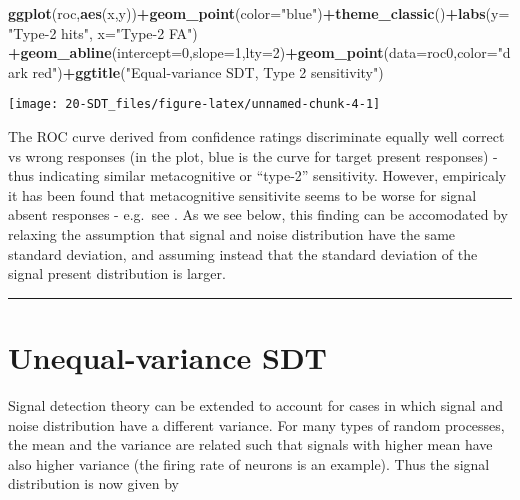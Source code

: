 \documentclass[
]{book}
\newenvironment{Shaded}{\begin{snugshade}}{\end{snugshade}}
\newcommand{\AttributeTok}[1]{\textcolor[rgb]{0.13,0.29,0.53}{#1}}
\newcommand{\DecValTok}[1]{\textcolor[rgb]{0.00,0.00,0.81}{#1}}
\newcommand{\FunctionTok}[1]{\textcolor[rgb]{0.13,0.29,0.53}{\textbf{#1}}}
\newcommand{\NormalTok}[1]{#1}
\newcommand{\SpecialCharTok}[1]{\textcolor[rgb]{0.81,0.36,0.00}{\textbf{#1}}}
\newcommand{\StringTok}[1]{\textcolor[rgb]{0.31,0.60,0.02}{#1}}
\begin{document}
\begin{Shaded}
\begin{Highlighting}[]
\FunctionTok{ggplot}\NormalTok{(roc,}\FunctionTok{aes}\NormalTok{(x,y))}\SpecialCharTok{+}\FunctionTok{geom\_point}\NormalTok{(}\AttributeTok{color=}\StringTok{"blue"}\NormalTok{)}\SpecialCharTok{+}\FunctionTok{theme\_classic}\NormalTok{()}\SpecialCharTok{+}\FunctionTok{labs}\NormalTok{(}\AttributeTok{y=}\StringTok{"Type{-}2 hits"}\NormalTok{, }\AttributeTok{x=}\StringTok{"Type{-}2 FA"}\NormalTok{) }\SpecialCharTok{+}\FunctionTok{geom\_abline}\NormalTok{(}\AttributeTok{intercept=}\DecValTok{0}\NormalTok{,}\AttributeTok{slope=}\DecValTok{1}\NormalTok{,}\AttributeTok{lty=}\DecValTok{2}\NormalTok{)}\SpecialCharTok{+}\FunctionTok{geom\_point}\NormalTok{(}\AttributeTok{data=}\NormalTok{roc0,}\AttributeTok{color=}\StringTok{"dark red"}\NormalTok{)}\SpecialCharTok{+}\FunctionTok{ggtitle}\NormalTok{(}\StringTok{"Equal{-}variance SDT, Type 2 sensitivity"}\NormalTok{)}
\end{Highlighting}
\end{Shaded}

\begin{center}\texttt{[image: 20-SDT\_files/figure-latex/unnamed-chunk-4-1]} \end{center}

The ROC curve derived from confidence ratings discriminate equally well correct vs wrong responses (in the plot, blue is the curve for target present responses) - thus indicating similar metacognitive or ``type-2'' sensitivity. However, empiricaly it has been found that metacognitive sensitivite seems to be worse for signal absent responses - e.g.~see \citep{Mazor2020}. As we see below, this finding can be accomodated by relaxing the assumption that signal and noise distribution have the same standard deviation, and assuming instead that the standard deviation of the signal present distribution is larger.

\begin{center}\rule{0.5\linewidth}{0.5pt}\end{center}

\section{Unequal-variance SDT}\label{unequal-variance-sdt}

Signal detection theory can be extended to account for cases in which signal and noise distribution have a different variance. For many types of random processes, the mean and the variance are related such that signals with higher mean have also higher variance (the firing rate of neurons is an example). Thus the signal distribution is now given by
\end{document}
